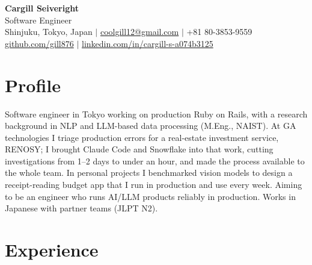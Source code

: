 \documentclass[10pt,letterpaper]{article}
\begin{document}
\begin{center}
  {\LARGE \textbf{Cargill Seiveright}}\\[3pt]
  {\large Software Engineer}\\[6pt]
  \small
  Shinjuku, Tokyo, Japan \quad $\vert$ \quad
  \href{mailto:coolgill12@gmail.com}{coolgill12@gmail.com} \quad $\vert$ \quad
  +81 80-3853-9559 \\[0pt]
  \href{https://github.com/gill876}{github.com/gill876} \quad $\vert$ \quad
  \href{https://www.linkedin.com/in/cargill-s-a074b3125/}{linkedin.com/in/cargill-s-a074b3125}
\end{center}

\section*{Profile}
Software engineer in Tokyo working on production Ruby on Rails, with a research background in NLP
and LLM-based data processing (M.Eng., NAIST). At GA technologies I triage production errors for a
real-estate investment service, RENOSY; I brought Claude Code and Snowflake into that work, cutting
investigations from 1--2 days to under an hour, and made the process available to the whole team.
In personal projects I benchmarked vision models to design a receipt-reading budget app that I run in
production and use every week. Aiming to be an engineer who runs AI/LLM products reliably in
production. Works in Japanese with partner teams (JLPT N2).

\section*{Experience}
\end{document}
